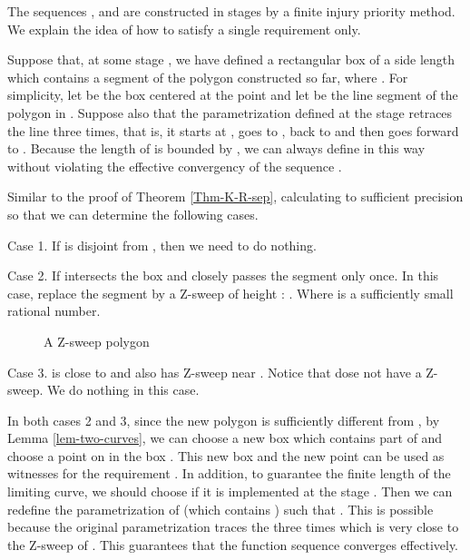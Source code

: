 \documentclass{LMCS}
\theoremstyle{plain}
\begin{document}
The sequences ,  and  are constructed in stages by a finite injury priority method. We explain the idea of how to satisfy a single requirement  only.

Suppose that, at some stage , we have defined a rectangular box  of a side length  which contains a segment of the polygon  constructed so far, where . For simplicity, let  be the box centered at the point  and let  be the line segment of the polygon  in . Suppose also that the parametrization  defined at the stage  retraces the line  three times, that is, it starts at , goes to , back to  and then goes forward to . Because the length of  is bounded by , we can always define  in this way without violating the effective convergency of the sequence .

Similar to the proof of Theorem \ref{Thm-K-R-sep}, calculating  to sufficient precision so that we can determine the following cases.

Case 1. If  is disjoint from , then we need to do nothing.

Case 2. If  intersects the box  and  closely passes the segment  only once. In this case, replace the segment  by a Z-sweep  of height : . Where  is a sufficiently small rational number.

\begin{figure}[h]
\begin{center}
\end{center}
\caption{A Z-sweep polygon }\label{fig-R-M}
\end{figure}

Case 3.  is close to  and also has Z-sweep near . Notice that  dose not have a Z-sweep. We do nothing in this case.

In both cases 2 and 3, since the new polygon  is sufficiently different from , by Lemma \ref{lem-two-curves}, we can choose a new box  which contains part of  and choose a point  on  in the box . This new box  and the new point  can be used as witnesses for the requirement . In addition, to guarantee the finite length of the limiting curve, we should choose  if it is implemented at the stage . Then we can redefine the parametrization  of  (which contains ) such that  . This is possible because the original parametrization  traces the  three times which is very close to the Z-sweep of . This guarantees that the function sequence  converges effectively.
\end{document}
